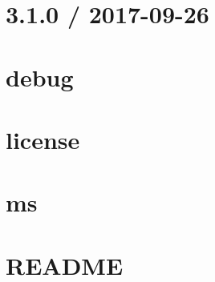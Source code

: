 \let\mypdfximage\pdfximage\def\pdfximage{\immediate\mypdfximage}\documentclass[twoside]{book}
\newcommand{\+}{\discretionary{\mbox{\scriptsize$\hookleftarrow$}}{}{}}
\begin{document}
\chapter{3.1.0 / 2017-\/09-\/26}
\label{md__c_1__git_hub__p_r_o_y_e_c_t_o-_i_i_i-_g_o_t_rest-api_node_modules_nodemon_node_modules_debug__c_h_a_n_g_e_l_o_g}

\chapter{debug}
\label{md__c_1__git_hub__p_r_o_y_e_c_t_o-_i_i_i-_g_o_t_rest-api_node_modules_nodemon_node_modules_debug__r_e_a_d_m_e}

\chapter{license}
\label{md__c_1__git_hub__p_r_o_y_e_c_t_o-_i_i_i-_g_o_t_rest-api_node_modules_nodemon_node_modules_ms_license}

\chapter{ms}
\label{md__c_1__git_hub__p_r_o_y_e_c_t_o-_i_i_i-_g_o_t_rest-api_node_modules_nodemon_node_modules_ms_readme}

\chapter{R\+E\+A\+D\+ME}
\label{md__c_1__git_hub__p_r_o_y_e_c_t_o-_i_i_i-_g_o_t_rest-api_node_modules_nodemon__r_e_a_d_m_e}

\end{document}
